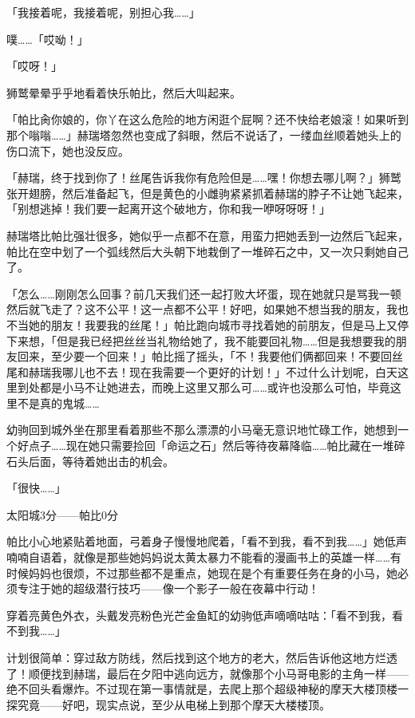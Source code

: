 「我接着呢，我接着呢，别担心我……」

噗……「哎呦！」

「哎呀！」

狮鹫晕晕乎乎地看着快乐帕比，然后大叫起来。

「帕比肏你娘的，你丫在这么危险的地方闲逛个屁啊？还不快给老娘滚！如果听到那个嗡嗡……」赫瑞塔忽然也变成了斜眼，然后不说话了，一缕血丝顺着她头上的伤口流下，她也没反应。

「赫瑞，终于找到你了！丝尾告诉我你有危险但是……嘿！你想去哪儿啊？」狮鹫张开翅膀，然后准备起飞，但是黄色的小雌驹紧紧抓着赫瑞的脖子不让她飞起来，「别想逃掉！我们要一起离开这个破地方，你和我一咿呀呀呀！」

赫瑞塔比帕比强壮很多，她似乎一点都不在意，用蛮力把她丢到一边然后飞起来，帕比在空中划了一个弧线然后大头朝下地栽倒了一堆碎石之中，又一次只剩她自己了。

「怎么……刚刚怎么回事？前几天我们还一起打败大坏蛋，现在她就只是骂我一顿然后就飞走了？这不公平！这一点都不公平！好吧，如果她不想当我的朋友，我也不当她的朋友！我要我的丝尾！」帕比跑向城市寻找着她的前朋友，但是马上又停下来想，「但是我已经把丝丝当礼物给她了，我不能要回礼物……但是我想要我的朋友回来，至少要一个回来！」帕比摇了摇头，「不！我要他们俩都回来！不要回丝尾和赫瑞我哪儿也不去！现在我需要一个更好的计划！」不过什么计划呢，白天这里到处都是小马不让她进去，而晚上这里又那么可……或许也没那么可怕，毕竟这里不是真的鬼城……

幼驹回到城外坐在那里看着那些不那么漂漂的小马毫无意识地忙碌工作，她想到一个好点子……现在她只需要捡回「命运之石」然后等待夜幕降临……帕比藏在一堆碎石头后面，等待着她出击的机会。

「很快……」

\begin{center}
太阳城3分——帕比0分
\end{center}

\horizonline


帕比小心地紧贴着地面，弓着身子慢慢地爬着，「看不到我，看不到我……」她低声喃喃自语着，就像是那些她妈妈说太黄太暴力不能看的漫画书上的英雄一样……有时候妈妈也很烦，不过那些都不是重点，她现在是个有重要任务在身的小马，她必须专注于她的超级潜行技巧——像一个影子一般在夜幕中行动！

穿着亮黄色外衣，头戴发亮粉色光芒金鱼缸的幼驹低声嘀嘀咕咕：「看不到我，看不到我……」

计划很简单：穿过敌方防线，然后找到这个地方的老大，然后告诉他这地方烂透了！顺便找到赫瑞，最后在夕阳中逃向远方，就像那个小马哥电影的主角一样——绝不回头看爆炸。不过现在第一事情就是，去爬上那个超级神秘的摩天大楼顶楼一探究竟——好吧，现实点说，至少从电梯上到那个摩天大楼楼顶。

